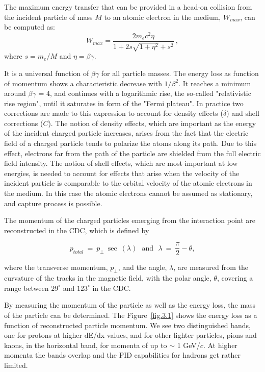 The maximum energy transfer that can be provided in a head-on collision from the incident particle of mass $M$ to an atomic electron in the medium, $W_{max}$, can be computed as:
\begin{equation}
    \label{eq.3.2}
    W_{max} = \frac{2 m_e c^2 \eta}{1 + 2 s \sqrt{1 + \eta^2} + s^2}~,
\end{equation}
where $s = m_e/M$ and $\eta = \beta \gamma$.
~\par It is a universal function of $\beta \gamma$ for all particle masses. The energy loss as function of momentum shows a characteristic decrease with $1/\beta^{2}$. It reaches a minimum around $\beta \gamma$ = 4, and continues with a logarithmic rise, the so-called "relativistic rise region", until it saturates in form of the "Fermi plateau". In practice two corrections are made to this expression to account for density effects ($\delta$) and shell corrections ($C$). The notion of density effects, which are important as the energy of the incident charged particle increases, arises from the fact that the electric field of a charged particle tends to polarize the atoms along its path. Due to this effect, electrons far from the path of the particle are shielded from the full electric field intensity. The notion of shell effects, which are most important at low energies, is needed to account for effects that arise when the velocity of the incident particle is comparable to the orbital velocity of the atomic electrons in the medium. In this case the atomic electrons cannot be assumed as stationary, and capture process is possible.
~\par The momentum of the charged particles emerging from the interaction point are reconstructed in the CDC, which is defined by

\begin{equation}
    \label{eq.3.2.1}
    p_{total}~=~p_{\perp}~\sec~(\lambda)~~~\mathrm{and}~~~\lambda~=~\frac{\pi}{2}-\theta,
\end{equation}

\noindent where the transverse momentum, $p_{\perp}$, and the angle, $\lambda$, are measured from the curvature of the tracks in the magnetic field, with the polar angle, $\theta$, covering a range between $29^{\circ}$ and $123^{\circ}$ in the CDC.
~\par By measuring the momentum of the particle as well as the energy loss, the mass of the particle can be determined. The Figure~\ref{fig.3.1} shows the energy loss as a function of reconstructed particle momentum. We see two distinguished bands, one for protons at higher dE/dx values, and for other lighter particles, pions and kaons, in the horizontal band, for momenta of up to $\sim$ 1 GeV/$c$. At higher momenta the bands overlap and the PID capabilities for hadrons get rather limited.

